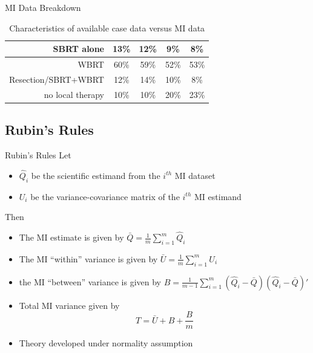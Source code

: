 \begin{frame}{MI Data Breakdown}
\begin{table}[!ht]
{\begin{tabular}{|r|c|c|c|c|}
SBRT alone                                        & 13\%                                                                  & 12\%                                                      & 9\%                                                                      & 8\%                                                          \\ \hline
WBRT                                              & 60\%                                                                  & 59\%                                                      & 52\%                                                                     & 53\%                                                         \\ \hline
Resection/SBRT+WBRT                               & 12\%                                                                  & 14\%                                                      & 10\%                                                                     & 8\%                                                          \\ \hline
no local therapy                                  & 10\%                                                                  & 10\%                                                      & 20\%                                                                     & 23\%                                                         \\ \hline
\end{tabular}
}
\caption{Characteristics of available case data versus MI data}
\label{table:chartab}
\end{table}
 
\end{frame}

\subsection{Rubin's Rules}
\begin{frame}{Rubin's Rules}
 Let
 \begin{itemize}
  \item $\hat{Q}_i$ be the scientific estimand from the $i^{th}$ MI dataset
  \item $U_i$ be the variance-covariance matrix of the $i^{th}$ MI estimand
 \end{itemize}
Then
\begin{itemize}
 \item The MI estimate is given by
 $\bar{Q}=\frac{1}{m}\sum_{i=1}^{m}\hat{Q}_i$
 \item The MI ``within'' variance is given by
 $\bar{U}=\frac{1}{m}\sum_{i=1}^{m}U_i$
 \item the MI ``between'' variance is given by
 $B=\frac{1}{m-1}\sum_{i=1}^{m}(\hat{Q}_i - \bar{Q})(\hat{Q}_i - \bar{Q})'$ %
   \item Total MI variance given by 
  $$T=\bar{U}+B +\frac{B}{m}$$
  \item Theory developed under normality assumption \cite{Rubin1987}
\end{itemize}

\end{frame}

